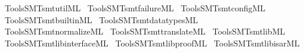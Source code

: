 \begin{isabellebody}
%
\endisadelimML
%
\isatagML
{}\isamarkupfalse%
\ {\isacartoucheopen}Tools{\isacharslash}{\kern0pt}SMT{\isacharslash}{\kern0pt}smt{\isacharunderscore}{\kern0pt}util{\isachardot}{\kern0pt}ML{\isacartoucheclose}\isanewline
{}\isamarkupfalse%
\ {\isacartoucheopen}Tools{\isacharslash}{\kern0pt}SMT{\isacharslash}{\kern0pt}smt{\isacharunderscore}{\kern0pt}failure{\isachardot}{\kern0pt}ML{\isacartoucheclose}\isanewline
{}\isamarkupfalse%
\ {\isacartoucheopen}Tools{\isacharslash}{\kern0pt}SMT{\isacharslash}{\kern0pt}smt{\isacharunderscore}{\kern0pt}config{\isachardot}{\kern0pt}ML{\isacartoucheclose}\isanewline
{}\isamarkupfalse%
\ {\isacartoucheopen}Tools{\isacharslash}{\kern0pt}SMT{\isacharslash}{\kern0pt}smt{\isacharunderscore}{\kern0pt}builtin{\isachardot}{\kern0pt}ML{\isacartoucheclose}\isanewline
{}\isamarkupfalse%
\ {\isacartoucheopen}Tools{\isacharslash}{\kern0pt}SMT{\isacharslash}{\kern0pt}smt{\isacharunderscore}{\kern0pt}datatypes{\isachardot}{\kern0pt}ML{\isacartoucheclose}\isanewline
{}\isamarkupfalse%
\ {\isacartoucheopen}Tools{\isacharslash}{\kern0pt}SMT{\isacharslash}{\kern0pt}smt{\isacharunderscore}{\kern0pt}normalize{\isachardot}{\kern0pt}ML{\isacartoucheclose}\isanewline
{}\isamarkupfalse%
\ {\isacartoucheopen}Tools{\isacharslash}{\kern0pt}SMT{\isacharslash}{\kern0pt}smt{\isacharunderscore}{\kern0pt}translate{\isachardot}{\kern0pt}ML{\isacartoucheclose}\isanewline
{}\isamarkupfalse%
\ {\isacartoucheopen}Tools{\isacharslash}{\kern0pt}SMT{\isacharslash}{\kern0pt}smtlib{\isachardot}{\kern0pt}ML{\isacartoucheclose}\isanewline
{}\isamarkupfalse%
\ {\isacartoucheopen}Tools{\isacharslash}{\kern0pt}SMT{\isacharslash}{\kern0pt}smtlib{\isacharunderscore}{\kern0pt}interface{\isachardot}{\kern0pt}ML{\isacartoucheclose}\isanewline
{}\isamarkupfalse%
\ {\isacartoucheopen}Tools{\isacharslash}{\kern0pt}SMT{\isacharslash}{\kern0pt}smtlib{\isacharunderscore}{\kern0pt}proof{\isachardot}{\kern0pt}ML{\isacartoucheclose}\isanewline
{}\isamarkupfalse%
\ {\isacartoucheopen}Tools{\isacharslash}{\kern0pt}SMT{\isacharslash}{\kern0pt}smtlib{\isacharunderscore}{\kern0pt}isar{\isachardot}{\kern0pt}ML{\isacartoucheclose}\isanewline

\end{isabellebody}

